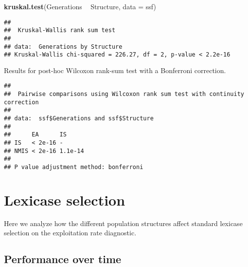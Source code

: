 \documentclass[]{book}
\newenvironment{Shaded}{\begin{snugshade}}{\end{snugshade}}
\newcommand{\DataTypeTok}[1]{\textcolor[rgb]{0.13,0.29,0.53}{#1}}
\newcommand{\KeywordTok}[1]{\textcolor[rgb]{0.13,0.29,0.53}{\textbf{#1}}}
\newcommand{\NormalTok}[1]{#1}
\newcommand{\OperatorTok}[1]{\textcolor[rgb]{0.81,0.36,0.00}{\textbf{#1}}}
\newcommand{\OtherTok}[1]{\textcolor[rgb]{0.56,0.35,0.01}{#1}}
\newcommand{\StringTok}[1]{\textcolor[rgb]{0.31,0.60,0.02}{#1}}
\begin{document}
\begin{Shaded}
\begin{Highlighting}[]
\KeywordTok{kruskal.test}\NormalTok{(Generations }\OperatorTok{~}\StringTok{ }\NormalTok{Structure, }\DataTypeTok{data =}\NormalTok{ ssf)}
\end{Highlighting}
\end{Shaded}

\begin{verbatim}
## 
##  Kruskal-Wallis rank sum test
## 
## data:  Generations by Structure
## Kruskal-Wallis chi-squared = 226.27, df = 2, p-value < 2.2e-16
\end{verbatim}

Results for post-hoc Wilcoxon rank-sum test with a Bonferroni correction.

\begin{Shaded}
\end{Shaded}

\begin{verbatim}
## 
##  Pairwise comparisons using Wilcoxon rank sum test with continuity correction 
## 
## data:  ssf$Generations and ssf$Structure 
## 
##      EA      IS     
## IS   < 2e-16 -      
## NMIS < 2e-16 1.1e-14
## 
## P value adjustment method: bonferroni
\end{verbatim}

\hypertarget{lexicase-selection}{%
\section{Lexicase selection}\label{lexicase-selection}}

Here we analyze how the different population structures affect standard lexicase selection on the exploitation rate diagnostic.

\hypertarget{performance-over-time-2}{%
\subsection{Performance over time}\label{performance-over-time-2}}
\end{document}
